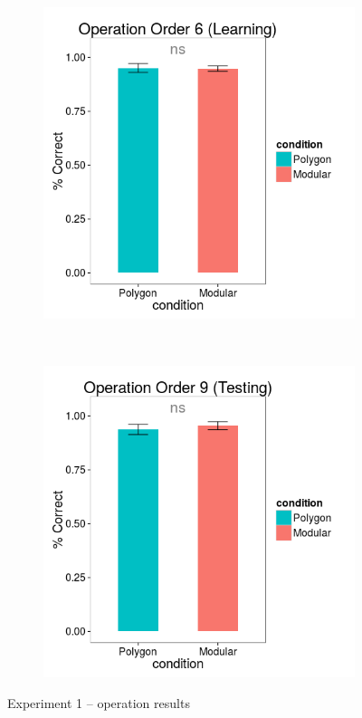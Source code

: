 \documentclass[man,10pt]{apa6}
\begin{document}
\begin{figure}[H]
\centering
\begin{subfigure}[c]{0.3\textwidth}
\centering
\includegraphics[width=\textwidth]{figures/1/op_6_r.png}
\end{subfigure}
~
\begin{subfigure}[c]{0.3\textwidth}
\centering
\includegraphics[width=\textwidth]{figures/1/op_9_r.png}
\end{subfigure}
\caption{Experiment 1 -- operation results}
\label{ex1_op}
\end{figure} 
\end{document}
